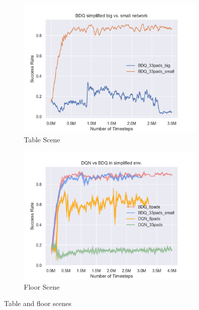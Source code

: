 \begin{figure}[!htbp]
    \begin{subfigure}{0.49\textwidth}
        \includegraphics[width=\linewidth]{figures/BDQ_simplified_big_vs_small_network_no_var}
        \caption{Table Scene} \label{fig:table}
    \end{subfigure}%
    \hspace*{\fill}   %
    \begin{subfigure}{0.49\textwidth}
        \includegraphics[width=\linewidth]{figures/DQN_vs_BDQ_in_simplified_env}
        \caption{Floor Scene} \label{fig:floor}
    \end{subfigure}%
    \hspace*{\fill}   %


\caption{ Table and floor scenes \label{fig:scenes}}
\end{figure}

